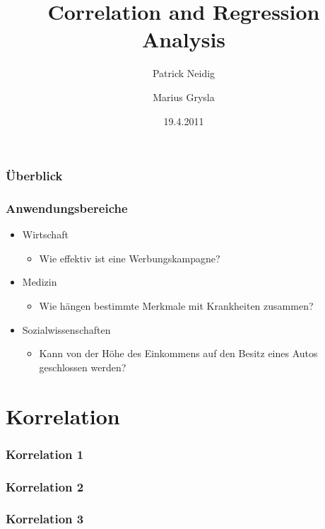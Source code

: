\documentclass{beamer}
\begin{document}
\title{Correlation and Regression Analysis}
\author{Patrick Neidig \and Marius Grysla}
\date{19.4.2011}
\frame{\titlepage}

\begin{frame}
 \frametitle{\"Uberblick}
 \tableofcontents
\end{frame}

\begin{frame}
 \frametitle{Anwendungsbereiche}

 \begin{itemize}
  \item Wirtschaft
  \begin{itemize}
   \item Wie effektiv ist eine Werbungskampagne?
  \end{itemize}

  \item Medizin
  \begin{itemize}
   \item Wie h\"angen bestimmte Merkmale mit Krankheiten zusammen?
  \end{itemize}

  \item Sozialwissenschaften
  \begin{itemize}
   \item Kann von der H\"ohe des Einkommens auf den Besitz eines Autos geschlossen werden?
  \end{itemize}


 \end{itemize}

\end{frame}


\section{Korrelation}

\begin{frame}
 \frametitle{Korrelation 1}
\end{frame}

\begin{frame}
 \frametitle{Korrelation 2}
\end{frame}

\begin{frame}
 \frametitle{Korrelation 3}
\end{frame}

\end{document}
